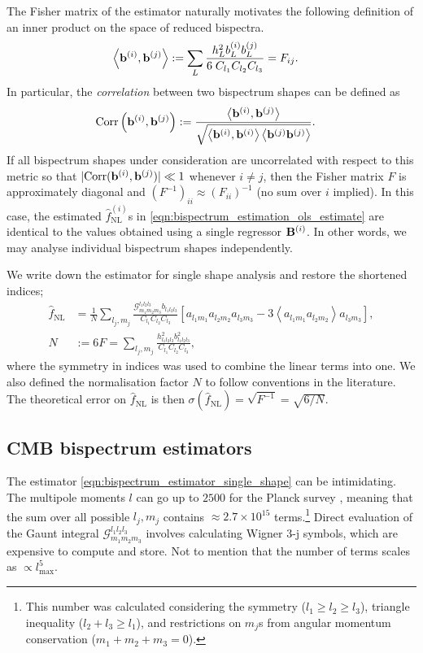The Fisher matrix of the estimator naturally motivates the following definition of an inner product on the space of reduced bispectra.
\begin{align}
	\left< \mathbf{b}^{(i)}, \mathbf{b}^{(j)} \right> &:= \sum_L \frac{h^2_L b^{(i)}_L b^{(j)}_L}{6 \; C_{l_1} C_{l_2} C_{l_3}}  = F_{ij}.	\label{def:bispectrum_estimation_fisher_inner_product}
\end{align}
In particular, the \textit{correlation} between two bispectrum shapes can be defined as
\begin{align}
	\text{Corr} \left( \mathbf{b}^{(i)}, \mathbf{b}^{(j)} \right) &:= \frac{ \left< \mathbf{b}^{(i)}, \mathbf{b}^{(j)} \right>}{\sqrt{ \left< \mathbf{b}^{(i)}, \mathbf{b}^{(i)} \right> \left< \mathbf{b}^{(j)} \mathbf{b}^{(j)} \right> }}.
\end{align}
If all bispectrum shapes under consideration are uncorrelated with respect to this metric so that $| \text{Corr}(\mathbf{b}^{(i)}, \mathbf{b}^{(j)}) | \ll 1$ whenever $i \neq j$, then the Fisher matrix $F$ is approximately diagonal and $(F^{-1})_{ii} \approx (F_{ii})^{-1}$ (no sum over $i$ implied). In this case, the estimated $\hat{f}_\text{NL}^{(i)}$s in \eqref{eqn:bispectrum_estimation_ols_estimate} are identical to the values obtained using a single regressor $\mathbf{B}^{(i)}$. In other words, we may analyse individual bispectrum shapes independently.

We write down the estimator for single shape analysis and restore the shortened indices;
\begin{align}
	\hat{f}_\text{NL} &= \frac{1}{N} \sum_{l_j,m_j} \frac{\mathcal{G}^{l_1 l_2 l_3}_{m_1 m_2 m_3} b_{l_1 l_2 l_3}}{C_{l_1} C_{l_2} C_{l_3}} \left[ a_{l_1 m_1} a_{l_2 m_2} a_{l_3 m_3} - 3\left< a_{l_1 m_1} a_{l_2 m_2} \right> a_{l_3 m_3} \right], \label{eqn:bispectrum_estimator_single_shape} \\
	N &:= 6F = \sum_{l_j,m_j} \frac{h^2_{l_1 l_2 l_3} b^2_{l_1 l_2 l_3}}{C_{l_1} C_{l_2} C_{l_3}}, \label{eqn:bispectrum_estimator_normalisation_single_shape}
\end{align}
where the symmetry in indices was used to combine the linear terms into one. We also defined the normalisation factor $N$ to follow conventions in the literature. The theoretical error on $\hat{f}_\text{NL}$ is then $\sigma(\hat{f}_\text{NL}) = \sqrt{F^{-1}} = \sqrt{6/N}$.

\subsection{CMB bispectrum estimators}
The estimator \eqref{eqn:bispectrum_estimator_single_shape} can be intimidating. The multipole moments $l$ can go up to $2500$ for the Planck survey \cite{PlanckCollaboration2013paramters}, meaning that the sum over all possible $l_j, m_j$ contains $\approx 2.7\times 10^{15}$ terms.\footnote{This number was calculated considering the symmetry ($l_1 \ge l_2 \ge l_3$), triangle inequality ($l_2+l_3 \ge l_1$), and restrictions on $m_j$s from angular momentum conservation ($m_1+m_2+m_3=0$). } Direct evaluation of the Gaunt integral $\mathcal{G}^{l_1 l_2 l_3}_{m_1 m_2 m_3}$ involves calculating Wigner 3-j symbols, which are expensive to compute and store. Not to mention that the number of terms scales as $\propto l_\text{max}^5$.

